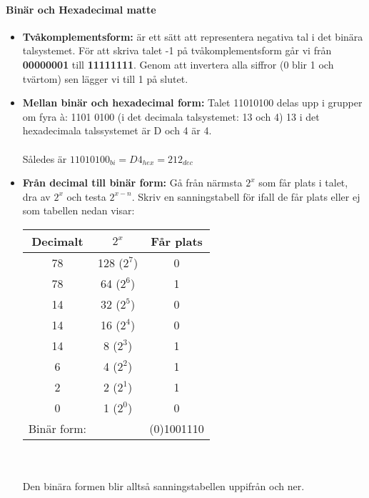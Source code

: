 \documentclass[a4paper]{article}
\begin{document}
\paragraph{Binär och Hexadecimal matte}
\begin{itemize}
\item \textbf{Tvåkomplementsform:} är ett sätt att representera negativa tal i det binära talsystemet. För att skriva talet -1 på tvåkomplementsform går vi från \textbf{00000001} till \textbf{11111111}. Genom att invertera alla siffror (0 blir 1 och tvärtom) sen lägger vi till 1 på slutet.

\item \textbf{Mellan binär och hexadecimal form:} Talet 11010100 delas upp i grupper om fyra à: 1101 0100 (i det decimala talsystemet: 13 och 4) 13 i det hexadecimala talssystemet är D och 4 är 4.\\
\\Således är $11010100_{bi} = D4_{hex} = 212_{dec}$

\item \textbf{Från decimal till binär form:}  Gå från närmsta $2^x$ som får plats i talet, dra av $2^x$ och testa $2^{x-n}$. Skriv en sanningstabell för ifall de får plats eller ej som tabellen nedan visar:

\begin{tabular}{ c | c | c }
\textbf{Decimalt} & \textbf{$2^x$} & \textbf{Får plats} \\ \hline
78 & 128 ($2^7$) & 0 \\
78 & 64 ($2^6$) & 1 \\
14 & 32 ($2^5$) & 0 \\
14 & 16 ($2^4$) & 0 \\
14 & 8 ($2^3$) & 1 \\
6 & 4 ($2^2$) & 1 \\
2 & 2 ($2^1$) & 1 \\
0 & 1 ($2^0$) & 0 \\ \hline \hline 
\multicolumn{1}{l}{Binär form:} & \multicolumn{1}{c}{}  &  \multicolumn{1}{c}{(0)1001110} \\

\end{tabular}\\
\\Den binära formen blir alltså sanningstabellen uppifrån och ner.
\end{itemize}
\end{document}
